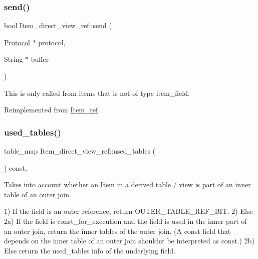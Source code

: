 \mbox{\label{classItem__direct__view__ref_a29104c4d5e1f37059a1b0e357bb0cfc9}} 
\subsubsection{\texorpdfstring{send()}{send()}}
{\footnotesize\ttfamily bool Item\+\_\+direct\+\_\+view\+\_\+ref\+::send (\begin{DoxyParamCaption}\item[{\mbox{\hyperlink{classProtocol}{Protocol}} $\ast$}]{protocol,  }\item[{String $\ast$}]{buffer }\end{DoxyParamCaption})\hspace{0.3cm}{\ttfamily [virtual]}}

This is only called from items that is not of type item\+\_\+field. 

Reimplemented from \mbox{\hyperlink{classItem__ref_a8a0631a3f2c781f2215d220df1e80869}{Item\+\_\+ref}}.

\mbox{\label{classItem__direct__view__ref_a53a4a787845b0c131234d3d9fb56d768}} 
\subsubsection{\texorpdfstring{used\+\_\+tables()}{used\_tables()}}
{\footnotesize\ttfamily table\+\_\+map Item\+\_\+direct\+\_\+view\+\_\+ref\+::used\+\_\+tables (\begin{DoxyParamCaption}{ }\end{DoxyParamCaption}) const\hspace{0.3cm}{\ttfamily [inline]}, {\ttfamily [virtual]}}

Takes into account whether an \mbox{\hyperlink{classItem}{Item}} in a derived table / view is part of an inner table of an outer join.

1) If the field is an outer reference, return O\+U\+T\+E\+R\+\_\+\+T\+A\+B\+L\+E\+\_\+\+R\+E\+F\+\_\+\+B\+IT. 2) Else 2a) If the field is const\+\_\+for\+\_\+execution and the field is used in the inner part of an outer join, return the inner tables of the outer join. (A \textquotesingle{}const\textquotesingle{} field that depends on the inner table of an outer join shouldn\textquotesingle{}t be interpreted as const.) 2b) Else return the used\+\_\+tables info of the underlying field.

